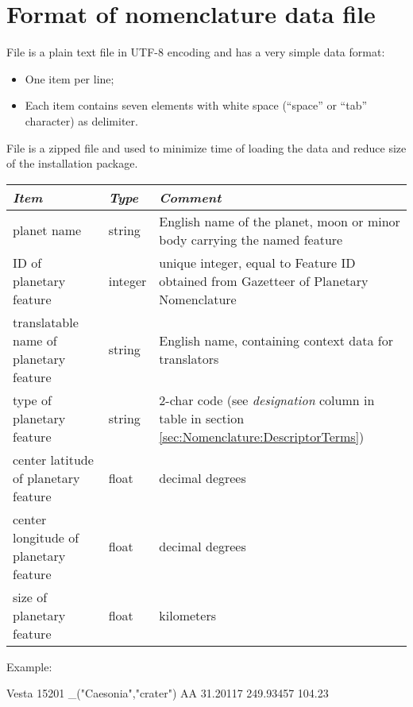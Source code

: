 \section{Format of nomenclature data file}
\label{sec:Nomenclature:format}

File  is a plain text file in UTF-8 encoding and has a very simple data format: 
\begin{itemize}
\item One item per line;
\item Each item contains seven elements with white space (``space'' or ``tab'' character) as delimiter.
\end{itemize}
File  is a zipped  file and used to minimize time of loading the data and reduce size of the installation package.

\begin{center}
\begin{tabularx}{\textwidth}{l|l|X}\toprule
\emph{Item}                              & \emph{Type} & \emph{Comment}\\\midrule
planet name                              & string  & English name of the planet, moon or minor body carrying the named feature\\%
ID of planetary feature                  & integer & unique integer, equal to Feature ID obtained from Gazetteer of Planetary Nomenclature\\%
translatable name of planetary feature   & string  & English name, containing context data for translators\\%
type of planetary feature                & string  & 2-char code (see \emph{designation} column in table in section \ref{sec:Nomenclature:DescriptorTerms})\\%
center latitude of planetary feature     & float   & decimal degrees\\%
center longitude of planetary feature    & float   & decimal degrees\\%
size of planetary feature                & float   & kilometers\\\bottomrule
\end{tabularx}
\end{center}

\noindent Example:
\begin{configfile}
Vesta 15201 _("Caesonia","crater") AA 31.20117 249.93457 104.23
\end{configfile}

